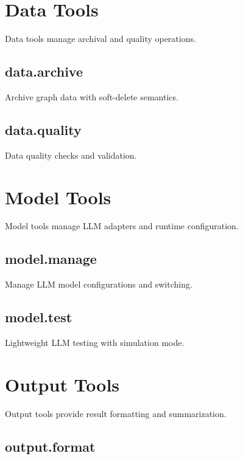 \documentclass[a4paper,twoside]{sapthesis}
\begin{document}
\section{Data Tools}
\label{app:tools:data}

Data tools manage archival and quality operations.

\subsection{data.archive}

Archive graph data with soft-delete semantics.

\subsection{data.quality}

Data quality checks and validation.

\section{Model Tools}
\label{app:tools:model}

Model tools manage LLM adapters and runtime configuration.

\subsection{model.manage}

Manage LLM model configurations and switching.

\subsection{model.test}

Lightweight LLM testing with simulation mode.

\section{Output Tools}
\label{app:tools:output}

Output tools provide result formatting and summarization.

\subsection{output.format}
\end{document}
